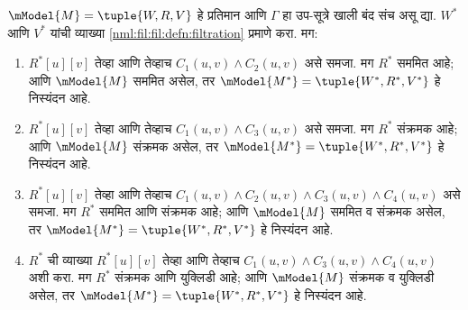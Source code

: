 \begin{thm}\label{nml:fil:acc:thm:more-filtrations}
  $\mModel{M} =\tuple{W,R,V}$ हे प्रतिमान आणि
  $\Gamma$ हा उप-सूत्रे खाली बंद संच असू द्या.
  $W^*$ आणि $V^*$ यांची व्याख्या
  \ref{nml:fil:fil:defn:filtration} प्रमाणे करा. मग:
  \begin{enumerate}
  \item $R^*[u][v]$ तेव्हा आणि तेव्हाच $C_1(u, v) \land
    C_2(u,v)$ असे समजा. मग $R^*$ सममित आहे; आणि
    $\mModel{M}$ सममित असेल, तर $\mModel{M^*} =
    \tuple{W^*,R^*,V^*}$ हे निस्यंदन आहे.
  \item $R^*[u][v]$ तेव्हा आणि तेव्हाच $C_1(u, v)
    \land C_3(u,v)$ असे समजा. मग $R^*$ संक्रमक आहे;
    आणि $\mModel{M}$ संक्रमक असेल, तर
    $\mModel{M^*}=\tuple{W^*,R^*,V^*}$ हे निस्यंदन आहे.
  \item $R^*[u][v]$ तेव्हा आणि तेव्हाच $C_1(u, v) \land C_2(u,v)
    \land C_3(u,v) \land C_4(u,v)$ असे समजा. मग $R^*$
    सममित आणि संक्रमक आहे; आणि $\mModel{M}$ सममित
    व संक्रमक असेल, तर $\mModel{M^*}=\tuple{W^*,R^*,V^*}$
    हे निस्यंदन आहे.
  \item $R^*$ ची व्याख्या $R^*[u][v]$ तेव्हा आणि तेव्हाच $C_1(u,
    v) \land C_3(u,v) \land C_4(u,v)$ अशी करा. मग $R^*$
    संक्रमक आणि युक्लिडी आहे; आणि $\mModel{M}$ संक्रमक
    व युक्लिडी असेल, तर $\mModel{M^*}=\tuple{W^*,R^*,V^*}$
    हे निस्यंदन आहे.
  \end{enumerate}
\end{thm}

